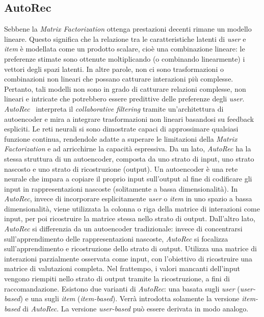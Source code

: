 \subsection{AutoRec}\label{autorec}
Sebbene la \textit{Matrix Factorization} ottenga prestazioni decenti rimane un modello lineare. Questo significa che la relazione tra le caratteristiche latenti di \textit{user} e \textit{item} è modellata come un prodotto scalare, cioè una combinazione lineare: le preferenze stimate sono ottenute moltiplicando (o combinando linearmente) i vettori degli spazi latenti. In altre parole, non ci sono trasformazioni o combinazioni non lineari che possano catturare interazioni più complesse. Pertanto, tali modelli non sono in grado di catturare relazioni complesse, non lineari e intricate che potrebbero essere predittive delle preferenze degli \textit{user}. \textit{AutoRec}~\cite{AutoRec} interpreta il \textit{collaborative filtering} tramite un'architettura di autoencoder e mira a integrare trasformazioni non lineari basandosi su feedback espliciti. Le reti neurali si sono dimostrate capaci di approssimare qualsiasi funzione continua, rendendole adatte a superare le limitazioni della \textit{Matrix Factorization} e ad arricchirne la capacità espressiva. Da un lato, \textit{AutoRec} ha la stessa struttura di un autoencoder, composta da uno strato di input, uno strato nascosto e uno strato di ricostruzione (output). Un autoencoder è una rete neurale che impara a copiare il proprio input sull'output al fine di codificare gli input in rappresentazioni nascoste (solitamente a bassa dimensionalità). In \textit{AutoRec}, invece di incorporare esplicitamente \textit{user} o \textit{item} in uno spazio a bassa dimensionalità, viene utilizzata la colonna o riga della matrice di interazioni come input, per poi ricostruire la matrice stessa nello strato di output. Dall'altro lato, \textit{AutoRec} si differenzia da un autoencoder tradizionale: invece di concentrarsi sull'apprendimento delle rappresentazioni nascoste, \textit{AutoRec} si focalizza sull'apprendimento e ricostruzione dello strato di output. Utilizza una matrice di interazioni parzialmente osservata come input, con l'obiettivo di ricostruire una matrice di valutazioni completa. Nel frattempo, i valori mancanti dell'input vengono riempiti nello strato di output tramite la ricostruzione, a fini di raccomandazione. Esistono due varianti di \textit{AutoRec}: una basata sugli \textit{user} (\textit{user-based}) e una sugli \textit{item} (\textit{item-based}). Verrà introdotta solamente la versione \textit{item-based} di \textit{AutoRec}. La versione \textit{user-based} può essere derivata in modo analogo.


